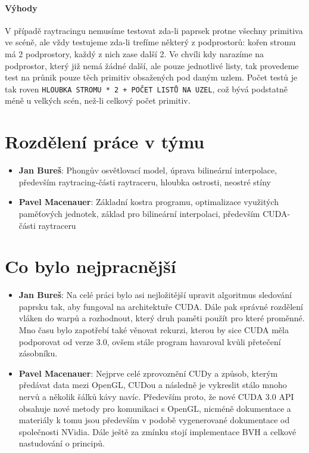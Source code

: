 \documentclass[12pt,a4paper,titlepage,final]{report}
\begin{document}
\paragraph{Výhody} V případě raytracingu nemusíme testovat zda-li paprsek protne všechny primitiva ve scéně, ale vždy testujeme zda-li trefíme některý z podprostorů: kořen stromu má 2 podprostory, každý z nich zase další 2. Ve chvíli kdy narazíme na podprostor, který již nemá žádné další, ale pouze jednotlivé listy, tak provedeme test na průnik pouze těch primitiv obsažených pod daným uzlem. Počet testů je tak roven \verb|HLOUBKA STROMU * 2 + POČET LISTŮ NA UZEL|, což bývá podstatně méně u velkých scén, než-li celkový počet primitiv.


\section{Rozdělení práce v týmu}

\begin{itemize}
\item \textbf{Jan Bureš}: Phongův osvětlovací model, úprava bilineární interpolace, především raytracing-části raytraceru, hloubka ostrosti, neostré stíny
\item \textbf{Pavel Macenauer}: Základní kostra programu, optimalizace využitých paměťových jednotek, základ pro bilineární interpolaci, především CUDA-části raytraceru 
\end{itemize}

\section{Co bylo nejpracnější}

\begin{itemize}
\item \textbf{Jan Bureš}: Na celé práci bylo asi nejložitější upravit algoritmus sledování paprsku tak, aby fungoval na architektuře CUDA. Dále pak správné rozdělení vláken do warpů a rozhodnout, který druh paměti použít pro které proměnné. Mno času bylo zapotřebí také věnovat rekurzi, kterou by sice CUDA měla podporovat od verze 3.0, ovšem stále program havaroval kvůli přetečení zásobníku.
\item \textbf{Pavel Macenauer}: Nejprve celé zprovoznění CUDy a způsob, kterým předávat data mezi OpenGL, CUDou a následně je vykreslit stálo mnoho nervů a několik šálků kávy navíc. Především proto, že nové CUDA 3.0 API obsahuje nové metody pro komunikaci s OpenGL, nicméně dokumentace a materiály k tomu jsou především v podobě vygenerované dokumentace od společnosti NVidia. Dále ještě za zmínku stojí implementace BVH a celkové nastudování o principů.
\end{itemize}
\end{document}
